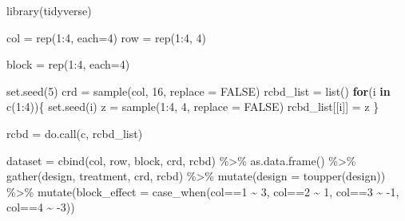 \documentclass[
]{book}
\newenvironment{Shaded}{\begin{snugshade}}{\end{snugshade}}
\newcommand{\AttributeTok}[1]{\textcolor[rgb]{0.77,0.63,0.00}{#1}}
\newcommand{\ConstantTok}[1]{\textcolor[rgb]{0.00,0.00,0.00}{#1}}
\newcommand{\ControlFlowTok}[1]{\textcolor[rgb]{0.13,0.29,0.53}{\textbf{#1}}}
\newcommand{\DecValTok}[1]{\textcolor[rgb]{0.00,0.00,0.81}{#1}}
\newcommand{\FunctionTok}[1]{\textcolor[rgb]{0.00,0.00,0.00}{#1}}
\newcommand{\NormalTok}[1]{#1}
\newcommand{\OtherTok}[1]{\textcolor[rgb]{0.56,0.35,0.01}{#1}}
\newcommand{\SpecialCharTok}[1]{\textcolor[rgb]{0.00,0.00,0.00}{#1}}
\begin{document}
\begin{Shaded}
\begin{Highlighting}[]
\FunctionTok{library}\NormalTok{(tidyverse)}

\NormalTok{col }\OtherTok{=} \FunctionTok{rep}\NormalTok{(}\DecValTok{1}\SpecialCharTok{:}\DecValTok{4}\NormalTok{, }\AttributeTok{each=}\DecValTok{4}\NormalTok{)}
\NormalTok{row }\OtherTok{=} \FunctionTok{rep}\NormalTok{(}\DecValTok{1}\SpecialCharTok{:}\DecValTok{4}\NormalTok{, }\DecValTok{4}\NormalTok{)}

\NormalTok{block }\OtherTok{=} \FunctionTok{rep}\NormalTok{(}\DecValTok{1}\SpecialCharTok{:}\DecValTok{4}\NormalTok{, }\AttributeTok{each=}\DecValTok{4}\NormalTok{)}

\FunctionTok{set.seed}\NormalTok{(}\DecValTok{5}\NormalTok{)}
\NormalTok{crd }\OtherTok{=} \FunctionTok{sample}\NormalTok{(col, }\DecValTok{16}\NormalTok{, }\AttributeTok{replace =} \ConstantTok{FALSE}\NormalTok{)}
\NormalTok{rcbd\_list }\OtherTok{=} \FunctionTok{list}\NormalTok{()}
\ControlFlowTok{for}\NormalTok{(i }\ControlFlowTok{in} \FunctionTok{c}\NormalTok{(}\DecValTok{1}\SpecialCharTok{:}\DecValTok{4}\NormalTok{))\{}
  \FunctionTok{set.seed}\NormalTok{(i)}
\NormalTok{  z }\OtherTok{=} \FunctionTok{sample}\NormalTok{(}\DecValTok{1}\SpecialCharTok{:}\DecValTok{4}\NormalTok{, }\DecValTok{4}\NormalTok{, }\AttributeTok{replace =} \ConstantTok{FALSE}\NormalTok{)}
\NormalTok{  rcbd\_list[[i]] }\OtherTok{=}\NormalTok{ z}
\NormalTok{\}}

\NormalTok{rcbd }\OtherTok{=} \FunctionTok{do.call}\NormalTok{(c, rcbd\_list)}

\NormalTok{dataset }\OtherTok{=} \FunctionTok{cbind}\NormalTok{(col, row, block, crd, rcbd) }\SpecialCharTok{\%\textgreater{}\%}
  \FunctionTok{as.data.frame}\NormalTok{() }\SpecialCharTok{\%\textgreater{}\%}
  \FunctionTok{gather}\NormalTok{(design, treatment, crd, rcbd) }\SpecialCharTok{\%\textgreater{}\%}
  \FunctionTok{mutate}\NormalTok{(}\AttributeTok{design =} \FunctionTok{toupper}\NormalTok{(design)) }\SpecialCharTok{\%\textgreater{}\%}
  \FunctionTok{mutate}\NormalTok{(}\AttributeTok{block\_effect =} \FunctionTok{case\_when}\NormalTok{(col}\SpecialCharTok{==}\DecValTok{1} \SpecialCharTok{\textasciitilde{}} \DecValTok{3}\NormalTok{,}
\NormalTok{                                  col}\SpecialCharTok{==}\DecValTok{2} \SpecialCharTok{\textasciitilde{}} \DecValTok{1}\NormalTok{,}
\NormalTok{                                  col}\SpecialCharTok{==}\DecValTok{3} \SpecialCharTok{\textasciitilde{}} \SpecialCharTok{{-}}\DecValTok{1}\NormalTok{,}
\NormalTok{                                  col}\SpecialCharTok{==}\DecValTok{4} \SpecialCharTok{\textasciitilde{}} \SpecialCharTok{{-}}\DecValTok{3}\NormalTok{)) }


\end{Highlighting}
\end{Shaded}
\end{document}
